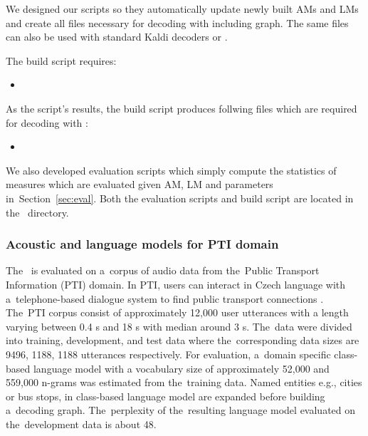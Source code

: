 We designed our scripts so they automatically update newly built \acp{AM} and \acp{LM} and create all files necessary for decoding with  including  graph.
The same files can also be used with standard Kaldi decoders or .

The  build script requires:
\begin{itemize}
    \item {}
\end{itemize}

As the script's results, the  build script produces follwing files which are required for decoding with :
\begin{itemize}
    \item {}
\end{itemize}

We also developed evaluation scripts which simply compute the statistics of measures which are evaluated given \ac{AM}, \ac{LM} and parameters in~Section~\ref{sec:eval}.
Both the evaluation scripts and build  script are located in the~ directory.

\subsubsection*{Acoustic and language models for \acs{PTI} domain}
\label{sec:ptilm}
The~ is evaluated on a~corpus of audio data from the~Public Transport Information (PTI) domain.
In PTI, users can interact in Czech language with a~telephone-based dialogue system to find public transport connections \cite{ptics2014url}.
The~PTI corpus consist of approximately 12,000 user utterances with a length varying between 0.4 s and 18 s with median around 3 s.
The~data were divided into training, development, and test data where the~corresponding data sizes are 9496, 1188, 1188 utterances respectively.
For evaluation, a~domain specific class-based language model with a vocabulary size of approximately 52,000  and 559,000 n-grams was estimated from the~training data.
Named entities e.g., cities or bus stops, in class-based language model are expanded before building a~decoding graph.
The~perplexity of the~resulting language model evaluated on the~development data is about 48.

